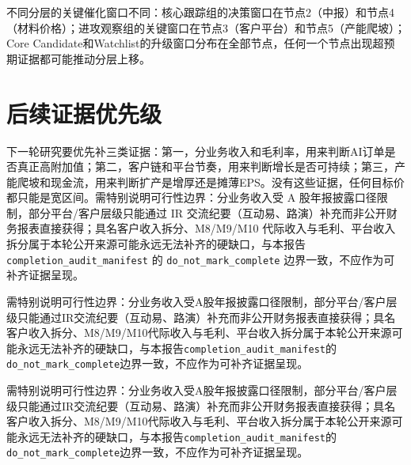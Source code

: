 不同分层的关键催化窗口不同：核心跟踪组的决策窗口在节点2（中报）和节点4（材料价格）；进攻观察组的关键窗口在节点3（客户平台）和节点5（产能爬坡）；Core Candidate和Watchlist的升级窗口分布在全部节点，任何一个节点出现超预期证据都可能推动分层上移。

\section{后续证据优先级}

下一轮研究要优先补三类证据：第一，分业务收入和毛利率，用来判断AI订单是否真正高附加值；第二，客户链和平台节奏，用来判断增长是否可持续；第三，产能爬坡和现金流，用来判断扩产是增厚还是摊薄EPS。没有这些证据，任何目标价都只能是宽区间。需特别说明可行性边界：分业务收入受 A 股年报披露口径限制，部分平台/客户层级只能通过 IR 交流纪要（互动易、路演）补充而非公开财务报表直接获得；具名客户收入拆分、M8/M9/M10 代际收入与毛利、平台收入拆分属于本轮公开来源可能永远无法补齐的硬缺口，与本报告 \texttt{completion\_audit\_manifest} 的 \texttt{do\_not\_mark\_complete} 边界一致，不应作为可补齐证据呈现。

需特别说明可行性边界：分业务收入受A股年报披露口径限制，部分平台/客户层级只能通过IR交流纪要（互动易、路演）补充而非公开财务报表直接获得；具名客户收入拆分、M8/M9/M10代际收入与毛利、平台收入拆分属于本轮公开来源可能永远无法补齐的硬缺口，与本报告\texttt{completion\_audit\_manifest}的\texttt{do\_not\_mark\_complete}边界一致，不应作为可补齐证据呈现。

需特别说明可行性边界：分业务收入受A股年报披露口径限制，部分平台/客户层级只能通过IR交流纪要（互动易、路演）补充而非公开财务报表直接获得；具名客户收入拆分、M8/M9/M10代际收入与毛利、平台收入拆分属于本轮公开来源可能永远无法补齐的硬缺口，与本报告\texttt{completion\_audit\_manifest}的\texttt{do\_not\_mark\_complete}边界一致，不应作为可补齐证据呈现。

